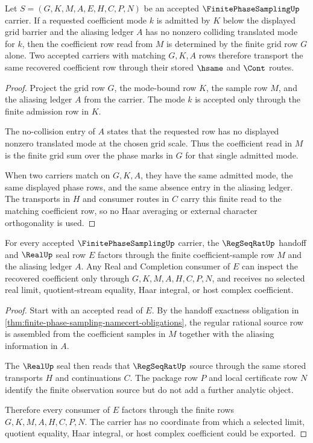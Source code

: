 \begin{theorem}
\label{thm:finite-phase-sampling-grid-recovery}
Let $S=(G,K,M,A,E,H,C,P,N)$ be an accepted $\FinitePhaseSamplingUp$ carrier. If a requested coefficient mode $k$ is admitted by $K$ below the displayed grid barrier and the aliasing ledger $A$ has no nonzero colliding translated mode for $k$, then the coefficient row read from $M$ is determined by the finite grid row $G$ alone. Two accepted carriers with matching $G,K,A$ rows therefore transport the same recovered coefficient row through their stored $\hsame$ and $\Cont$ routes.
\end{theorem}
\begin{proof}
Project the grid row $G$, the mode-bound row $K$, the sample row $M$, and the aliasing ledger $A$ from the carrier. The mode $k$ is accepted only through the finite admission row in $K$.

The no-collision entry of $A$ states that the requested row has no displayed nonzero translated mode at the chosen grid scale. Thus the coefficient read in $M$ is the finite grid sum over the phase marks in $G$ for that single admitted mode.

When two carriers match on $G,K,A$, they have the same admitted mode, the same displayed phase rows, and the same absence entry in the aliasing ledger. The transports in $H$ and consumer routes in $C$ carry this finite read to the matching coefficient row, so no Haar averaging or external character orthogonality is used.
\end{proof}

\begin{theorem}
\label{thm:finite-phase-sampling-real-handoff}
For every accepted $\FinitePhaseSamplingUp$ carrier, the $\RegSeqRatUp$ handoff and $\RealUp$ seal row $E$ factors through the finite coefficient-sample row $M$ and the aliasing ledger $A$. Any Real and Completion consumer of $E$ can inspect the recovered coefficient only through $G,K,M,A,H,C,P,N$, and receives no selected real limit, quotient-stream equality, Haar integral, or host complex coefficient.
\end{theorem}
\begin{proof}
Start with an accepted read of $E$. By the handoff exactness obligation in \autoref{thm:finite-phase-sampling-namecert-obligations}, the regular rational source row is assembled from the coefficient samples in $M$ together with the aliasing information in $A$.

The $\RealUp$ seal then reads that $\RegSeqRatUp$ source through the same stored transports $H$ and continuations $C$. The package row $P$ and local certificate row $N$ identify the finite observation source but do not add a further analytic object.

Therefore every consumer of $E$ factors through the finite rows $G,K,M,A,H,C,P,N$. The carrier has no coordinate from which a selected limit, quotient equality, Haar integral, or host complex coefficient could be exported.
\end{proof}

